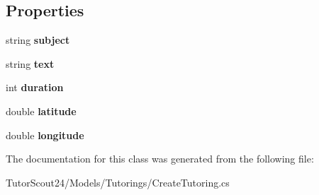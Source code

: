 \subsection*{Properties}
\begin{DoxyCompactItemize}
\item 
\mbox{\label{class_tutor_scout24_1_1_models_1_1_tutorings_1_1_create_tutoring_a3906599ed460d4f266c6e3f6af832914}} 
string {\bfseries subject}
\item 
\mbox{\label{class_tutor_scout24_1_1_models_1_1_tutorings_1_1_create_tutoring_a8fa2ed0af1412e6a55601bcff57f0397}} 
string {\bfseries text}
\item 
\mbox{\label{class_tutor_scout24_1_1_models_1_1_tutorings_1_1_create_tutoring_ab7b74f2c5c7977aeda7a658c49d9ec3b}} 
int {\bfseries duration}
\item 
\mbox{\label{class_tutor_scout24_1_1_models_1_1_tutorings_1_1_create_tutoring_a9dff0acbac3474d1da31b0e94b1e3d39}} 
double {\bfseries latitude}
\item 
\mbox{\label{class_tutor_scout24_1_1_models_1_1_tutorings_1_1_create_tutoring_a7feff49e417243ca43fc31944a73dbe7}} 
double {\bfseries longitude}
\end{DoxyCompactItemize}


The documentation for this class was generated from the following file\+:\begin{DoxyCompactItemize}
\item 
Tutor\+Scout24/\+Models/\+Tutorings/Create\+Tutoring.\+cs\end{DoxyCompactItemize}
